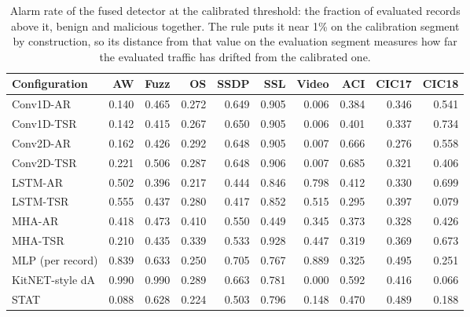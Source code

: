 \begin{table}[ht]\centering\footnotesize\setlength{\tabcolsep}{3.5pt}
\begin{tabular}{lrrrrrrrrr}
\hline
\textbf{Configuration} & \textbf{AW} & \textbf{Fuzz} & \textbf{OS} & \textbf{SSDP} & \textbf{SSL} & \textbf{Video} & \textbf{ACI} & \textbf{CIC17} & \textbf{CIC18}\\
\hline
Conv1D-AR & 0.140 & 0.465 & 0.272 & 0.649 & 0.905 & 0.006 & 0.384 & 0.346 & 0.541\\
Conv1D-TSR & 0.142 & 0.415 & 0.267 & 0.650 & 0.905 & 0.006 & 0.401 & 0.337 & 0.734\\
Conv2D-AR & 0.162 & 0.426 & 0.292 & 0.648 & 0.905 & 0.007 & 0.666 & 0.276 & 0.558\\
Conv2D-TSR & 0.221 & 0.506 & 0.287 & 0.648 & 0.906 & 0.007 & 0.685 & 0.321 & 0.406\\
LSTM-AR & 0.502 & 0.396 & 0.217 & 0.444 & 0.846 & 0.798 & 0.412 & 0.330 & 0.699\\
LSTM-TSR & 0.555 & 0.437 & 0.280 & 0.417 & 0.852 & 0.515 & 0.295 & 0.397 & 0.079\\
MHA-AR & 0.418 & 0.473 & 0.410 & 0.550 & 0.449 & 0.345 & 0.373 & 0.328 & 0.426\\
MHA-TSR & 0.210 & 0.435 & 0.339 & 0.533 & 0.928 & 0.447 & 0.319 & 0.369 & 0.673\\
MLP (per record) & 0.839 & 0.633 & 0.250 & 0.705 & 0.767 & 0.889 & 0.325 & 0.495 & 0.251\\
KitNET-style dA & 0.990 & 0.990 & 0.289 & 0.663 & 0.781 & 0.000 & 0.592 & 0.416 & 0.066\\
STAT & 0.088 & 0.628 & 0.224 & 0.503 & 0.796 & 0.148 & 0.470 & 0.489 & 0.188\\
\hline
\end{tabular}
\caption{Alarm rate of the fused detector at the calibrated threshold: the fraction of evaluated records above it, benign and malicious together. The rule puts it near 1\% on the calibration segment by construction, so its distance from that value on the evaluation segment measures how far the evaluated traffic has drifted from the calibrated one.}\label{tab:s_alarm}
\end{table}


